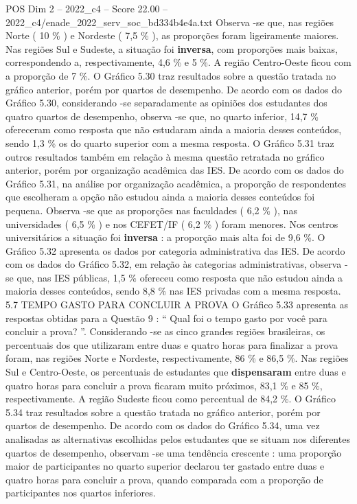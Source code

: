 \begin{textsample}{POS Dim 2 – 2022\_c4 – Score 22.00 – 2022\_c4/enade\_2022\_serv\_soc\_bd334b4e4a.txt}
Observa -se que, nas regiões Norte ( 10 \% ) e Nordeste ( 7,5 \% ), as proporções foram ligeiramente maiores.
Nas regiões Sul e Sudeste, a situação foi \textbf{inversa}, com proporções mais baixas, correspondendo a, respectivamente, 4,6 \% e 5 \%.
A região Centro-Oeste ficou com a proporção de 7 \%.
O Gráfico 5.30 traz resultados sobre a questão tratada no gráfico anterior, porém por quartos de desempenho.
De acordo com os dados do Gráfico 5.30, considerando -se separadamente as opiniões dos estudantes dos quatro quartos de desempenho, observa -se que, no quarto inferior, 14,7 \% ofereceram como resposta que não estudaram ainda a maioria desses conteúdos, sendo 1,3 \% os do quarto superior com a mesma resposta.
O Gráfico 5.31 traz outros resultados também em relação à mesma questão retratada no gráfico anterior, porém por organização acadêmica das IES.
De acordo com os dados do Gráfico 5.31, na análise por organização acadêmica, a proporção de respondentes que escolheram a opção não estudou ainda a maioria desses conteúdos foi pequena.
Observa -se que as proporções nas faculdades ( 6,2 \% ), nas universidades ( 6,5 \% ) e nos CEFET/IF ( 6,2 \% ) foram menores.
Nos centros universitários a situação foi \textbf{inversa} : a proporção mais alta foi de 9,6 \%.
O Gráfico 5.32 apresenta os dados por categoria administrativa das IES.
De acordo com os dados do Gráfico 5.32, em relação às categorias administrativas, observa -se que, nas IES públicas, 1,5 \% ofereceu como resposta que não estudou ainda a maioria desses conteúdos, sendo 8,8 \% nas IES privadas com a mesma resposta. 5.7 TEMPO GASTO PARA CONCLUIR A PROVA O Gráfico 5.33 apresenta as respostas obtidas para a Questão 9 : “ Qual foi o tempo gasto por você para concluir a prova? ”.
Considerando -se as cinco grandes regiões brasileiras, os percentuais dos que utilizaram entre duas e quatro horas para finalizar a prova foram, nas regiões Norte e Nordeste, respectivamente, 86 \% e 86,5 \%.
Nas regiões Sul e Centro-Oeste, os percentuais de estudantes que \textbf{dispensaram} entre duas e quatro horas para concluir a prova ficaram muito próximos, 83,1 \% e 85 \%, respectivamente.
A região Sudeste ficou como percentual de 84,2 \%.
O Gráfico 5.34 traz resultados sobre a questão tratada no gráfico anterior, porém por quartos de desempenho.
De acordo com os dados do Gráfico 5.34, uma vez analisadas as alternativas escolhidas pelos estudantes que se situam nos diferentes quartos de desempenho, observam -se uma tendência crescente : uma proporção maior de participantes no quarto superior declarou ter gastado entre duas e quatro horas para concluir a prova, quando comparada com a proporção de participantes nos quartos inferiores.

\end{textsample}
